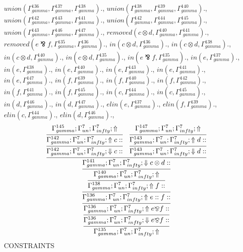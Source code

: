 \documentclass[a4paper, 11pt]{article}
\begin{document}
$union(\Gamma_{gamma}^{136}, \Gamma_{gamma}^{137}, \Gamma_{gamma}^{138}).$, $union(\Gamma_{gamma}^{138}, \Gamma_{gamma}^{139}, \Gamma_{gamma}^{140}).$, $union(\Gamma_{gamma}^{142}, \Gamma_{gamma}^{143}, \Gamma_{gamma}^{141}).$, $union(\Gamma_{gamma}^{142}, \Gamma_{gamma}^{144}, \Gamma_{gamma}^{145}).$, $union(\Gamma_{gamma}^{143}, \Gamma_{gamma}^{146}, \Gamma_{gamma}^{147}).$, $removed(c \otimes d, \Gamma_{gamma}^{140}, \Gamma_{gamma}^{141}).$, $removed(e \bindnasrepma f, \Gamma_{gamma}^{135}, \Gamma_{gamma}^{136}).$, $in(c \otimes d, \Gamma_{gamma}^{136}).$, $in(c \otimes d, \Gamma_{gamma}^{138}).$, $in(c \otimes d, \Gamma_{gamma}^{140}).$, $in(c \otimes d, \Gamma_{gamma}^{135}).$, $in(e \bindnasrepma f, \Gamma_{gamma}^{135}).$, $in(e, \Gamma_{gamma}^{137}).$, $in(e, \Gamma_{gamma}^{138}).$, $in(e, \Gamma_{gamma}^{140}).$, $in(e, \Gamma_{gamma}^{143}).$, $in(e, \Gamma_{gamma}^{141}).$, $in(e, \Gamma_{gamma}^{147}).$, $in(f, \Gamma_{gamma}^{139}).$, $in(f, \Gamma_{gamma}^{140}).$, $in(f, \Gamma_{gamma}^{142}).$, $in(f, \Gamma_{gamma}^{141}).$, $in(f, \Gamma_{gamma}^{145}).$, $in(c, \Gamma_{gamma}^{144}).$, $in(c, \Gamma_{gamma}^{145}).$, $in(d, \Gamma_{gamma}^{146}).$, $in(d, \Gamma_{gamma}^{147}).$, $elin(e, \Gamma_{gamma}^{137}).$, $elin(f, \Gamma_{gamma}^{139}).$, $elin(c, \Gamma_{gamma}^{144}).$, $elin(d, \Gamma_{gamma}^{146}).$, 
{\small
\[
\infer{\Gamma_{ gamma}^{135} ; \Gamma_{un}^{7} ; \Gamma_{ infty}^{7} ;  \Uparrow }
{\infer{\Gamma_{ gamma}^{136} ; \Gamma_{un}^{7} ; \Gamma_{ infty}^{7} ;  \Downarrow e \bindnasrepma f :: }
{\infer{\Gamma_{ gamma}^{136} ; \Gamma_{un}^{7} ; \Gamma_{ infty}^{7} ;  \Uparrow e \bindnasrepma f :: }
{\infer{\Gamma_{ gamma}^{136} ; \Gamma_{un}^{7} ; \Gamma_{ infty}^{7} ;  \Uparrow e :: f :: }
{\infer{\Gamma_{ gamma}^{138} ; \Gamma_{un}^{7} ; \Gamma_{ infty}^{7} ;  \Uparrow f :: }
{\infer{\Gamma_{ gamma}^{140} ; \Gamma_{un}^{7} ; \Gamma_{ infty}^{7} ;  \Uparrow }
{\infer{\Gamma_{ gamma}^{141} ; \Gamma_{un}^{7} ; \Gamma_{ infty}^{7} ;  \Downarrow c \otimes d :: }
{\infer{\Gamma_{ gamma}^{142} ; \Gamma_{un}^{7} ; \Gamma_{ infty}^{7} ;  \Downarrow c :: }
{\infer{\Gamma_{ gamma}^{142} ; \Gamma_{un}^{7} ; \Gamma_{ infty}^{7} ;  \Uparrow c :: }
{\Gamma_{ gamma}^{145} ; \Gamma_{un}^{7} ; \Gamma_{ infty}^{7} ;  \Uparrow }}
&
\infer{\Gamma_{ gamma}^{143} ; \Gamma_{un}^{7} ; \Gamma_{ infty}^{7} ;  \Downarrow d :: }
{\infer{\Gamma_{ gamma}^{143} ; \Gamma_{un}^{7} ; \Gamma_{ infty}^{7} ;  \Uparrow d :: }
{\Gamma_{ gamma}^{147} ; \Gamma_{un}^{7} ; \Gamma_{ infty}^{7} ;  \Uparrow }}}}}}}}}
\]
}
CONSTRAINTS
\end{document}
